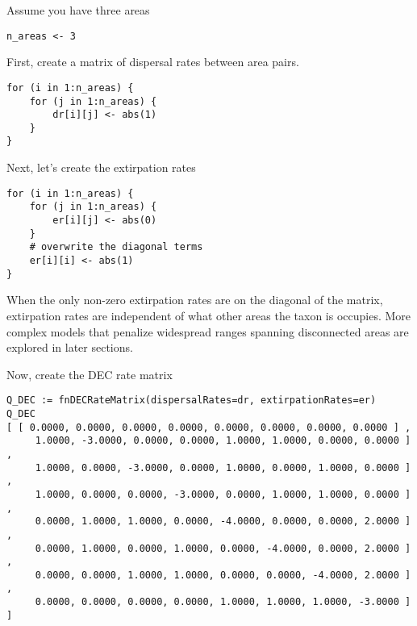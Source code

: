 Assume you have three areas

\begin{snugshade}
\begin{lstlisting}
n_areas <- 3
\end{lstlisting}
\end{snugshade}

First, create a matrix of dispersal rates between area pairs.

\begin{snugshade}
\begin{lstlisting}
for (i in 1:n_areas) {
    for (j in 1:n_areas) {
        dr[i][j] <- abs(1)
    }
}
\end{lstlisting}
\end{snugshade}

Next, let's create the extirpation rates

\begin{snugshade}
\begin{lstlisting}
for (i in 1:n_areas) {
    for (j in 1:n_areas) {
        er[i][j] <- abs(0)
    }
    # overwrite the diagonal terms
    er[i][i] <- abs(1) 
}
\end{lstlisting}
\end{snugshade}

When the only non-zero extirpation rates are on the diagonal of the matrix, extirpation rates are independent of what other areas the taxon is occupies.
More complex models that penalize widespread ranges spanning disconnected areas are explored in later sections.

Now, create the DEC rate matrix

\begin{snugshade}
\begin{lstlisting}
Q_DEC := fnDECRateMatrix(dispersalRates=dr, extirpationRates=er)
Q_DEC
[ [ 0.0000, 0.0000, 0.0000, 0.0000, 0.0000, 0.0000, 0.0000, 0.0000 ] ,
     1.0000, -3.0000, 0.0000, 0.0000, 1.0000, 1.0000, 0.0000, 0.0000 ] ,
     1.0000, 0.0000, -3.0000, 0.0000, 1.0000, 0.0000, 1.0000, 0.0000 ] ,
     1.0000, 0.0000, 0.0000, -3.0000, 0.0000, 1.0000, 1.0000, 0.0000 ] ,
     0.0000, 1.0000, 1.0000, 0.0000, -4.0000, 0.0000, 0.0000, 2.0000 ] ,
     0.0000, 1.0000, 0.0000, 1.0000, 0.0000, -4.0000, 0.0000, 2.0000 ] ,
     0.0000, 0.0000, 1.0000, 1.0000, 0.0000, 0.0000, -4.0000, 2.0000 ] ,
     0.0000, 0.0000, 0.0000, 0.0000, 1.0000, 1.0000, 1.0000, -3.0000 ] ]
\end{lstlisting}
\end{snugshade}

